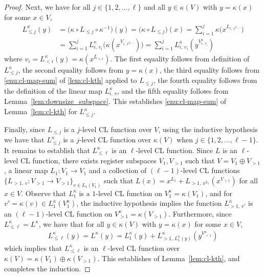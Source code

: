 \documentclass[11pt]{article}
\theoremstyle{definition}
\newcommand{\downsize}{\kappa}
\begin{document}
\begin{proof}
  Next, we have for all $j \in \{1, 2, \ldots, \ell\}$ and all $y \in
  \downsize(V)$ with $y = \downsize(x)$ for some $x \in V$,
  \begin{equation*}
    \begin{split}
      L_{\leq j}^\downsize(y)
      & = \bigl( \downsize \circ L_{\leq j} \circ \downsize^{-1} \bigr) (y)
      = \bigl( \downsize \circ L_{\le j} \bigr) (x)
      = \sum_{i=1}^{j} \downsize \bigl( x^{L_{i,\, x^{L_{<i}}}} \bigr)\\
      & = \sum_{i=1}^{j} L^\downsize_{i,\, v_i}
      \bigl( \downsize(x^{V_{i,\, x^{L_{<i}}}}) \bigr)
      = \sum_{i=1}^{j} L^\downsize_{i,\, v_i} (y^{V^\downsize_{i,\, v_i}})
    \end{split}
  \end{equation*}
  where $v_i = L^\downsize_{< i}(y) = \downsize(x^{L_{<i}})$.
  The first equality follows from definition of $L^\downsize_{\leq j}$, the
  second equality follows from $y = \downsize(x)$, the third equality follows
  from \cref{enu:cl-map-sum} of \cref{lem:cl-kth} applied to $L_{\leq j}$, the
  fourth equality follows from the definition of the linear map
  $L^\downsize_{i,\, v}$, and the fifth equality follows from
  Lemma~\ref{lem:downsize_subspace}.
  This establishes \cref{enu:cl-map-sum} of Lemma~\ref{lem:cl-kth} for
  $L^\downsize_{\leq j}$.

  Finally, since $L_{\leq j}$ is a $j$-level CL function over $V$, using the
  inductive hypothesis we have that $L^\downsize_{\leq j}$ is a $j$-level CL
  function over $\downsize(V)$ when $j \in \{1,2,\ldots,\ell-1\}$.
  It remains to establish that $L_{\leq \ell}^\downsize$ is an $\ell$-level CL
  function.
  Since $L$ is an $\ell$-level CL function, there exists register subspaces
  $V_1, V_{> 1}$ such that $V = V_1 \oplus V_{> 1}$, a linear map $L_1 : V_1 \to
  V_1$ and a collection of $(\ell-1)$-level CL functions $\{ L_{>1,\, v} : V_{>
    1} \to V_{> 1} \}_{v \in L_1(V_1)}$ such that $L(x) = x^{L_1} + L_{>1,\,
    x^{L_1}}(x^{V_{>1}})$ for all $x \in V$.
  Observe that $L_1^\downsize$ is a $1$-level CL function on $V_1^\downsize =
  \downsize(V_1)$, and for $v' = \downsize(v) \in L_1^\downsize(V_1^\downsize)$,
  the inductive hypothesis implies the function $L_{>1,\, v'}^\downsize$ is an
  $(\ell-1)$-level CL function on $V_{>1}^\downsize = \downsize(V_{>1})$.
  Furthermore, since $L^\downsize_{\leq \ell} = L^\downsize$, we have that for
  all $y \in \downsize(V)$ with $y = \downsize(x)$ for some $x \in V$,
  \begin{gather*}
  	L^\downsize_{\leq \ell}(y) = L^\downsize(y) = L_1^\downsize(y) +
    L^\downsize_{>1,\, L_1^\downsize(y)}(y^{V_{>1}^\downsize})
  \end{gather*} 
  which implies that $L^\downsize_{\leq \ell}$ is an $\ell$-level CL function
  over $\downsize(V) = \downsize(V_1) \oplus \downsize(V_{>1})$.
  This establishes  of Lemma~\ref{lem:cl-kth}, and completes
  the induction.
\end{proof}
\end{document}
